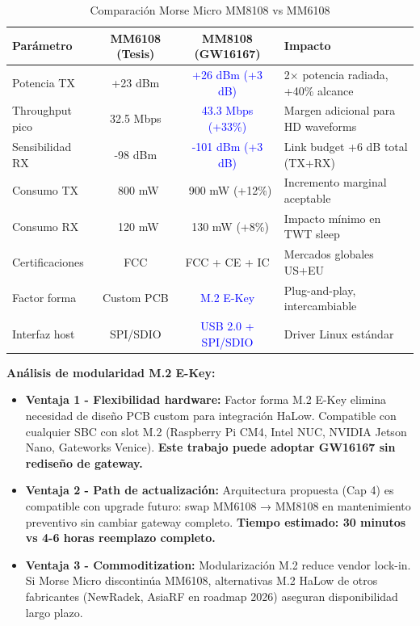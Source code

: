 \begin{table}[H]
\centering
\caption{Comparación Morse Micro MM8108 vs MM6108}
\label{tab:mm8108-vs-mm6108}
\scriptsize
\begin{tabular}{|l|c|c|p{4.5cm}|}
\hline
\textbf{Parámetro} & \textbf{MM6108 (Tesis)} & \textbf{MM8108 (GW16167)} & \textbf{Impacto} \\
\hline
Potencia TX & +23 dBm & \textcolor{blue}{+26 dBm (+3 dB)} & 2$\times$ potencia radiada, +40\% alcance \\
\hline
Throughput pico & 32.5 Mbps & \textcolor{blue}{43.3 Mbps (+33\%)} & Margen adicional para HD waveforms \\
\hline
Sensibilidad RX & -98 dBm & \textcolor{blue}{-101 dBm (+3 dB)} & Link budget +6 dB total (TX+RX) \\
\hline
Consumo TX & ~800 mW & ~900 mW (+12\%) & Incremento marginal aceptable \\
\hline
Consumo RX & ~120 mW & ~130 mW (+8\%) & Impacto mínimo en TWT sleep \\
\hline
Certificaciones & FCC & FCC + CE + IC & Mercados globales US+EU \\
\hline
Factor forma & Custom PCB & \textcolor{blue}{M.2 E-Key} & Plug-and-play, intercambiable \\
\hline
Interfaz host & SPI/SDIO & \textcolor{blue}{USB 2.0 + SPI/SDIO} & Driver Linux estándar \\
\hline
\end{tabular}
\end{table}

\textbf{Análisis de modularidad M.2 E-Key:}

\begin{itemize}
    \item \textbf{Ventaja 1 - Flexibilidad hardware:} Factor forma M.2 E-Key elimina necesidad de diseño PCB custom para integración HaLow. Compatible con cualquier SBC con slot M.2 (Raspberry Pi CM4, Intel NUC, NVIDIA Jetson Nano, Gateworks Venice). \textbf{Este trabajo puede adoptar GW16167 sin rediseño de gateway.}
    
    \item \textbf{Ventaja 2 - Path de actualización:} Arquitectura propuesta (Cap 4) es compatible con upgrade futuro: swap MM6108 → MM8108 en mantenimiento preventivo sin cambiar gateway completo. \textbf{Tiempo estimado: 30 minutos vs 4-6 horas reemplazo completo.}
    
    \item \textbf{Ventaja 3 - Commoditization:} Modularización M.2 reduce vendor lock-in. Si Morse Micro discontinúa MM6108, alternativas M.2 HaLow de otros fabricantes (NewRadek, AsiaRF en roadmap 2026) aseguran disponibilidad largo plazo.
\end{itemize}

